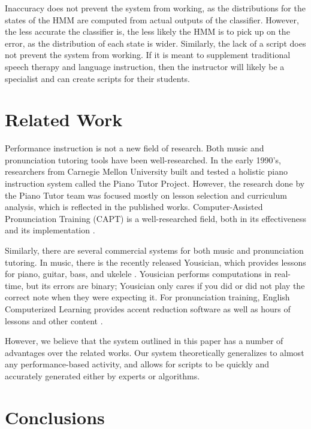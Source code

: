 \documentclass[twocolumn]{article}
\begin{document}
Inaccuracy does not prevent the system from working, as the distributions for the states of the HMM are computed from actual outputs of the classifier. However, the less accurate the classifier is, the less likely the HMM is to pick up on the error, as the distribution of each state is wider. Similarly, the lack of a script does not prevent the system from working. If it is meant to supplement traditional speech therapy and language instruction, then the instructor will likely be a specialist and can create scripts for their students.

\section{Related Work}

Performance instruction is not a new field of research. Both music and pronunciation tutoring tools have been well-researched. In the early 1990’s, researchers from Carnegie Mellon University built and tested a holistic piano instruction system called the Piano Tutor Project. However, the research done by the Piano Tutor team was focused mostly on lesson selection and curriculum analysis, which is reflected in the published works. Computer-Assisted Pronunciation Training (CAPT) is a well-researched field, both in its effectiveness and its implementation \cite{cylwik2009euronounce}.

Similarly, there are several commercial systems for both music and pronunciation tutoring. In music, there is the recently released Yousician, which provides lessons for piano, guitar, bass, and ukelele \cite{yousician}. Yousician performs computations in real-time, but its errors are binary; Yousician only cares if you did or did not play the correct note when they were expecting it. For pronunciation training, English Computerized Learning provides accent reduction software as well as hours of lessons and other content \cite{englishlearning} \cite{neri2008effectiveness}.

However, we believe that the system outlined in this paper has a number of advantages over the related works. Our system theoretically generalizes to almost any performance-based activity, and allows for scripts to be quickly and accurately generated either by experts or algorithms.

\section{Conclusions}
\end{document}
